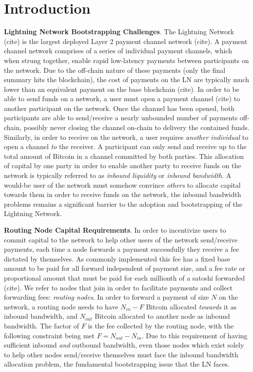 \documentclass[12pt,a4paper]{article}
\theoremstyle{definition}
\begin{document}
\section{Introduction}

\textbf{Lightning Network Bootstrapping Challenges}. The Lightning Network
(cite) is the largest deployed Layer 2 payment channel network (cite). A
payment channel network comprises of a series of individual payment channels,
which when strung together, enable rapid low-latency payments between
participants on the network. Due to the off-chain nature of these payments
(only the final summary hits the blockchain), the cost of payments on the LN
are typically much lower than an equivalent payment on the base blockchain
(cite). In order to be able to send funds on a network, a user must open a
payment channel (cite) to another participant on the network. Once the channel
has been opened, both participants are able to send/receive a nearly unbounded
number of payments off-chain, possibly never closing the channel on-chain to
delivery the contained funds. Similarly, in order to receive on the network, a
user requires \emph{another individual} to open a channel \emph{to} the
receiver. A participant can only send and receive up to the total amount of
Bitcoin in a channel committed by both parties. This allocation of capital by
one party in order to enable another party to receive funds on the network is
typically referred to as \emph{inbound liquidity} or \emph{inbound bandwidth}.
A would-be user of the network must somehow convince \emph{others} to allocate
capital towards them in order to receive funds on the network, the inbound
bandwidth problems remains a significant barrier to the adoption and
bootstrapping of the Lightning Network.

\textbf{Routing Node Capital Requirements}.  In order to incentivize users to
commit capital to the network to help other users of the network send/receive
payments, each time a node forwards a payment successfully they receive a fee
dictated by themselves. As commonly implemented this fee has a fixed base
amount to be paid for all forward independent of payment size, and a fee rate
or proportional amount that must be paid for each millionth of a satoshi
forwarded (cite). We refer to nodes that join in order to facilitate payments
and collect forwarding fees: \emph{routing nodes}. In order to forward a
payment of size $N$ on the network, a routing node needs to have $N_{in} - F$
Bitcoin allocated \emph{towards} it as inbound bandwidth, and $N_{out}$ Bitcoin
allocated to another node as inbound bandwidth. The factor of $F$ is the fee
collected by the routing node, with the following constraint being met $F =
N_{out} - N_{in}$. Due to this requirement of having sufficient inbound
\emph{and} outbound bandwidth, even those nodes which exist solely to help
other nodes send/receive themselves must face the inbound bandwidth allocation
problem, the fundamental bootstrapping issue that the LN faces.
\end{document}

